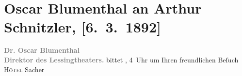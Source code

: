 

         \renewcommand{\erwaehnteInstitutionen}{Institutionen: Lessing-Theater}
         \renewcommand{\erwaehnteOrte}{Orte: Hotel Sacher, Wien}
         \renewcommand{\erwaehnteWerke}{}
               \section[Oscar Blumenthal an Arthur Schnitzler, {[}6. 3. 1892{]}]{ Oscar Blumenthal an Arthur Schnitzler, {[}6. 3. 1892{]}}\nopagebreak{}\rehead{ }\begin{ledgroupsized}[t]{13cm}\normalsize\beginnumbering \toendnotes[C]{\smallbreak\pagebreak[2]} 
\toendnotes[C]{\smallbreak}\pstart
           \noindent{}\centering{}{\pb}\textcolor{gray}{\textbf{Dr. Oscar Blumenthal}}{\\}\textcolor{gray}{\textbf{Direktor des Lessingtheaters.}}\pend
           \pstart
           \noindent{}bittet \label{K_L00077_1v}\label{K_L00077_1h}, 4 Uhr um Ihren freundlichen Beſuch \textsc{Hôtel}{ }Sacher\pend
           
         
         \endnumbering{}\end{ledgroupsized}  \newcommand{\dateiname}{L00077}\newcommand{\titel}{Oscar Blumenthal an Arthur Schnitzler, [6. 3. 1892]}\newcommand{\editorInnen}{Martin Anton Müller und Gerd-Hermann Susen}
      
